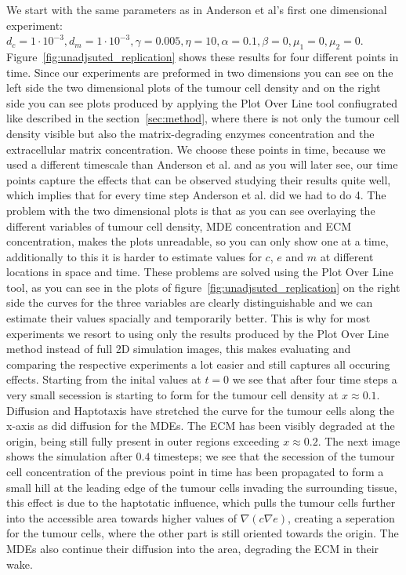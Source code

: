 We start with the same parameters as in Anderson et al's first one dimensional experiment: $d_c = 1\cdot 10^{-3}, d_m = 1\cdot 10^{-3}, \gamma = 0.005, \eta = 10, \alpha = 0.1, \beta = 0, \mu_1 = 0, \mu_2 = 0$. Figure~\ref{fig:unadjsuted_replication} shows these results for four different points in time. Since our experiments are preformed in two dimensions you can see on the left side the two dimensional plots of the tumour cell density and on the right side you can see plots produced by applying the Plot Over Line tool confiugrated like described in the section~\ref{sec:method}, where there is not only the tumour cell density visible but also the matrix-degrading enzymes concentration and the extracellular matrix concentration. We choose these points in time, because we used a different timescale than Anderson et al. and as you will later see, our time points capture the effects that can be observed studying their results quite well, which implies that for every time step Anderson et al. did we had to do 4. The problem with the two dimensional plots is that as you can see overlaying the different variables of tumour cell density, MDE concentration and ECM concentration, makes the plots unreadable, so you can only show one at a time, additionally to this it is harder to estimate values for $c$, $e$ and $m$ at different locations in space and time. These problems are solved using the Plot Over Line tool, as you can see in the plots of figure~\ref{fig:unadjsuted_replication} on the right side the curves for the three variables are clearly distinguishable and we can estimate their values spacially and temporarily better. This is why for most experiments we resort to using only the results produced by the Plot Over Line method instead of full 2D simulation images, this makes evaluating and comparing the respective experiments a lot easier and still captures all occuring effects. \newline
Starting from the inital values at $t=0$ we see that after four time steps a very small secession is starting to form for the tumour cell density at $x\approx 0.1$. Diffusion and Haptotaxis have stretched the curve for the tumour cells along the x-axis as did diffusion for the MDEs. The ECM has  been visibly degraded at the origin, being still fully present in outer regions exceeding $x\approx 0.2$.\newline
The next image shows the simulation after $0.4$ timesteps; we see that the secession of the tumour cell concentration of the previous point in time has been propagated to form a small hill at the leading edge of the tumour cells invading the surrounding tissue, this effect is due to the haptotatic influence, which pulls the tumour cells further into the accessible area towards higher values of $\nabla (c \nabla e)$, creating a seperation for the tumour cells, where the other part is still oriented towards the origin. The MDEs also continue their diffusion into the area, degrading the ECM in their wake.\newline 
